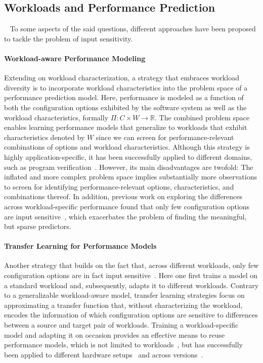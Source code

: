 	
\subsection{Workloads and Performance Prediction} ~\label{sec:strategies}
To some aspects of the said questions, different approaches have been proposed to tackle the problem of input sensitivity.

\paragraph{Workload-aware Performance Modeling}\label{sec:workload-aware}
Extending on workload characterization, a strategy that embraces workload diversity is to incorporate workload characteristics into the problem space of a performance prediction model. Here, performance is modeled as a function of both the configuration options exhibited by the software system as well as the workload characteristics, formally $\Pi: C \times W \rightarrow \mathbb{R}$.
The combined problem space enables learning performance models that generalize to workloads that exhibit characteristics denoted by $W$ since we can screen for performance-relevant combinations of options and workload characteristics. Although this strategy is highly application-specific, it has been successfully applied to different domains, such as program verification~\cite{koc_satune_2021}. However, its main disadvantages are twofold: {\color{purple}The inflated and more complex problem space implies substantially more observations to screen for identifying performance-relevant options, characteristics, and combinations thereof.} {\color{violet}In addition, previous work on exploring the differences across workload-specific performance found that only few configuration options are input sensitive~\cite{jamishidi_transfer_2017}, which exacerbates the problem of finding the meaningful, but sparse predictors.}

\paragraph{Transfer Learning for Performance Models}\label{sec:transfer}
Another strategy that builds on the fact that, across different workloads, only few configuration options are in fact input sensitive~\cite{jamishidi_transfer_2017}. Here one first trains a model on a standard workload and, subsequently, adapts it to different workloads. Contrary to a generalizable workload-aware model, transfer learning strategies focus on approximating a transfer function that, without characterizing the workload, encodes the information of which configuration options are sensitive to differences between a source and target pair of workloads. Training a workload-specific model and adapting it on occasion provides an effective means to reuse performance models, which is not limited to workloads~\cite{jamshidi_learning_2018}, but has successfully been applied to different hardware setups~\cite{ding_bayesian_2020,valov_transferring_performance_2017} and across versions~\cite{martin_transfer_2021}. \\

